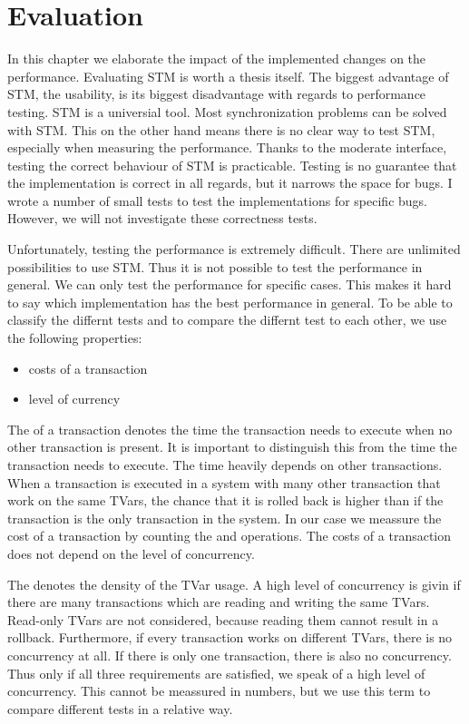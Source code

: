 
\chapter{Evaluation} 

\label{Chapter4}
In this chapter we elaborate the impact of the implemented changes on the performance.
Evaluating STM is worth a thesis itself. The biggest advantage of STM, the usability, is
its biggest disadvantage with regards to performance testing. STM is a universial tool. Most
synchronization problems can be solved with STM. This on the other hand means there
is no clear way to test STM, especially when measuring the performance. Thanks to
the moderate interface, testing the correct behaviour of STM is practicable. Testing 
is no guarantee that the implementation is correct in all regards, but it narrows the 
space for bugs. I wrote a number of small tests to test the implementations for specific bugs.
However, we will not investigate these correctness tests.


Unfortunately, testing the performance is extremely difficult. There are unlimited 
possibilities to use STM. Thus it is not possible to test the performance in general.
We can only test the performance for specific cases. This makes it hard to say which 
implementation has the best performance in general. To be able to classify the differnt 
tests and to compare the differnt test to each other, we use the following properties: 
\begin{itemize}
 \item costs of a transaction
 \item level of currency
\end{itemize}
The  of a transaction denotes the time the transaction needs to execute when no 
other transaction is present.  
It is important to distinguish this from the time the transaction needs to execute. The
time heavily depends on other transactions. When a transaction is executed in a system
with many other transaction that work on the same TVars, the chance that it is rolled 
back is higher than if the transaction is the only transaction in the system. In our case 
we meassure the cost of a transaction by counting the  and  
operations. The costs of a transaction does not depend on the level of concurrency.

The  denotes the density of the TVar usage. A high level of 
concurrency is givin if there are many transactions which are reading and writing the same
TVars. Read-only TVars are not considered, because reading them cannot result in a rollback.
Furthermore, if every transaction works on different TVars, there is no concurrency at all. If there 
is only one transaction, there is also no concurrency. Thus only if all three requirements are satisfied,
we speak of a high level of concurrency. This cannot be meassured in numbers, but we use this term
to compare different tests in a relative way.

